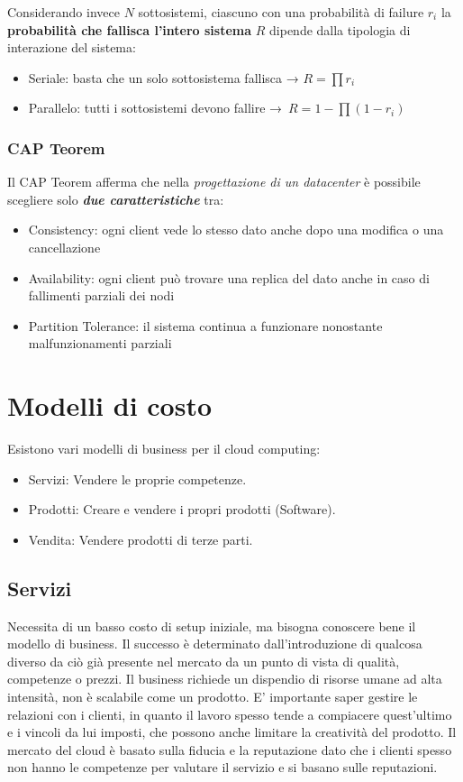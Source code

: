 \documentclass{article}
\providecommand{\tightlist}{%
		  \setlength{\itemsep}{0pt}\setlength{\parskip}{0pt}}
\begin{document}
		Considerando invece \(N\) sottosistemi, ciascuno con una
		probabilità di failure \(r_i\) la \textbf{probabilità
			che fallisca l'intero sistema} \(R\) dipende dalla
		tipologia di interazione del sistema:
		
		\begin{itemize}
			\tightlist
			\item
			Seriale: basta che un solo sottosistema fallisca →
			\(R=\prod r_i\)
			\item
			Parallelo: tutti i sottosistemi devono fallire
			→~\(R = 1- \prod (1-r_i)\)
		\end{itemize}
		
		\subsubsection{CAP Teorem}\label{cap-teorem}
		
		Il CAP Teorem afferma che nella \emph{progettazione di un
			datacenter} è possibile scegliere solo \textbf{\emph{due
				caratteristiche}} tra:
			\begin{itemize}
				\item Consistency: ogni client vede lo stesso dato anche dopo una modifica o una cancellazione
				\item Availability: ogni client può trovare una replica del dato anche in caso di fallimenti parziali dei nodi
				\item Partition Tolerance: il sistema continua a funzionare nonostante malfunzionamenti parziali
			\end{itemize}
		
		\newpage
		\section{Modelli di costo}
		Esistono vari modelli di business per il cloud computing:
		\begin{itemize}
			\item Servizi: Vendere le proprie competenze.
			\item Prodotti: Creare e vendere i propri prodotti (Software).
			\item Vendita: Vendere prodotti di terze parti.
		\end{itemize}
		
		\subsection{Servizi}
		Necessita di un basso costo di setup iniziale, ma bisogna conoscere bene il modello di business. Il successo è determinato dall'introduzione di qualcosa diverso da ciò già presente nel mercato da un punto di vista di qualità, competenze o prezzi.
		Il business richiede un dispendio di risorse umane ad alta intensità, non è scalabile come un prodotto. E' importante saper gestire le relazioni con i clienti, in quanto il lavoro spesso tende a compiacere quest'ultimo e i vincoli da lui imposti, che possono anche limitare la creatività del prodotto.
		Il mercato del cloud è basato sulla fiducia e la reputazione dato che i clienti spesso non hanno le competenze per valutare il servizio e si basano sulle reputazioni.
		
\end{document}
